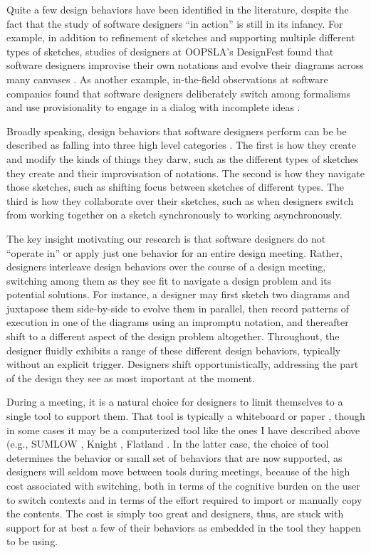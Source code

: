 Quite a few design behaviors have been identified in the literature, despite the fact that the study of software designers ``in action'' is still in its infancy. For example, in addition to refinement of sketches and supporting multiple different types of sketches, studies of designers at OOPSLA’s DesignFest found that software designers improvise their own notations and evolve their diagrams across many canvases \cite{dekel2007notation}. As another example, in-the-field observations at software companies found that software designers deliberately switch among formalisms and use provisionality to engage in a dialog with incomplete ideas \cite{petre2009insights}. 

Broadly speaking, design behaviors that software designers perform can be be described as falling into three high level categories . The  first is how they create and modify the kinds of things they darw, such as the different types of sketches they create and their improvisation of notations. The second is how they navigate those sketches, such as shifting focus between sketches of different types. The third is how they collaborate over their sketches, such as when designers switch from working together on a sketch synchronously to working asynchronously. 

The key insight motivating our research is that software designers do not ``operate in'' or apply just one behavior for an entire design meeting. Rather, designers interleave design behaviors over the course of a design meeting, switching among them as they see fit to navigate a design problem and its potential solutions. For instance, a designer may first sketch two diagrams and juxtapose them side-by-side to evolve them in parallel, then record patterns of execution in one of the diagrams using an impromptu notation, and thereafter shift to a different aspect of the design problem altogether. Throughout, the designer fluidly exhibits a range of these different design behaviors, typically without an explicit trigger. Designers shift opportunistically, addressing the part of the design they see as most important at the moment.

During a meeting, it is a natural choice for designers to limit themselves to a single tool to support them. That tool is typically a whiteboard or paper \cite{petre2009insights}, though in some cases it may be a computerized tool like the ones I have described above (e.g., SUMLOW \cite{chen2008sumlow}, Knight \cite{damm2000tool}, Flatland \cite{mynatt1999flatland}. In the latter case, the choice of tool determines the behavior or small set of behaviors that are now supported, as designers will seldom move between tools during meetings, because of the high cost associated with switching, both in terms of the cognitive burden on the user to switch contexts and in terms of the effort required to import or manually copy the contents. The cost is simply too great and designers, thus, are stuck with support for at best a few of their behaviors as embedded in the tool they happen to be using.

